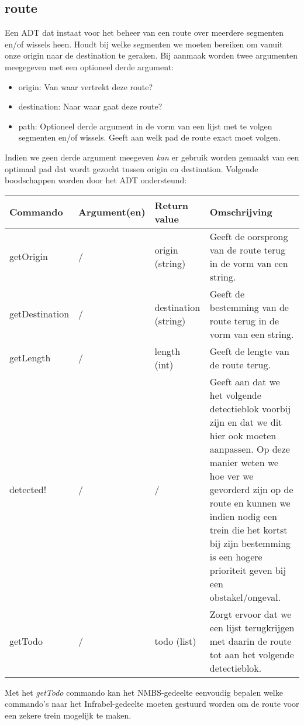 \documentclass{article}
\begin{document}
\subsection{route} %
Een ADT dat instaat voor het beheer van een route over meerdere segmenten en/of wissels heen. Houdt bij welke segmenten we moeten bereiken om vanuit onze origin naar de destination te geraken. Bij aanmaak worden twee argumenten meegegeven met een optioneel derde argument:
\begin{itemize}
  \item origin: Van waar vertrekt deze route?
  \item destination: Naar waar gaat deze route?
  \item path: Optioneel derde argument in de vorm van een lijst met te volgen segmenten en/of wissels. Geeft aan welk pad de route exact moet volgen.
\end{itemize}
Indien we geen derde argument meegeven \textit{kan} er gebruik worden gemaakt van een optimaal pad dat wordt gezocht tussen origin en destination.
Volgende boodschappen worden door het ADT ondersteund:
\begin{center}
    \begin{tabular}{ | l | l | l | p{8cm} |}
    \hline
    Commando & Argument(en) & Return value & Omschrijving \\ \hline
    getOrigin & / & origin (string) & Geeft de oorsprong van de route terug in de vorm van een string. \\ \hline
    getDestination & / & destination (string) & Geeft de bestemming van de route terug in de vorm van een string. \\ \hline
    getLength & / & length (int) & Geeft de lengte van de route terug. \\ \hline
    detected! & / & / & Geeft aan dat we het volgende detectieblok voorbij zijn en dat we dit hier ook moeten aanpassen. Op deze manier weten we hoe ver we gevorderd zijn op de route en kunnen we indien nodig een trein die het kortst bij zijn bestemming is een hogere prioriteit geven bij een obstakel/ongeval. \\ \hline
    getTodo & / & todo (list) & Zorgt ervoor dat we een lijst terugkrijgen met daarin de route tot aan het volgende detectieblok. \\ \hline
    \end{tabular}
\end{center}

\noindent Met het \textit{getTodo} commando kan het NMBS-gedeelte eenvoudig bepalen welke commando's naar het Infrabel-gedeelte moeten gestuurd worden om de route voor een zekere trein mogelijk te maken.
\end{document}
